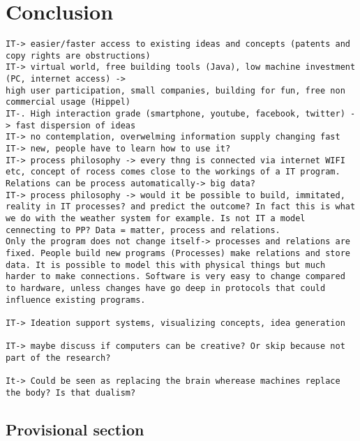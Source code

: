 \chapter{Conclusion}

\begin{verbatim}
IT-> easier/faster access to existing ideas and concepts (patents and copy rights are obstructions)
IT-> virtual world, free building tools (Java), low machine investment (PC, internet access) -> 
high user participation, small companies, building for fun, free non commercial usage (Hippel)
IT-. High interaction grade (smartphone, youtube, facebook, twitter) -> fast dispersion of ideas
IT-> no contemplation, overwelming information supply changing fast
IT-> new, people have to learn how to use it?
IT-> process philosophy -> every thng is connected via internet WIFI etc, concept of rocess comes close to the workings of a IT program. Relations can be process automatically-> big data?
IT-> process philosophy -> would it be possible to build, immitated, reality in IT processes? and predict the outcome? In fact this is what we do with the weather system for example. Is not IT a model cennecting to PP? Data = matter, process and relations.
Only the program does not change itself-> processes and relations are fixed. People build new programs (Processes) make relations and store data. It is possible to model this with physical things but much harder to make connections. Software is very easy to change compared to hardware, unless changes have go deep in protocols that could influence existing programs.

IT-> Ideation support systems, visualizing concepts, idea generation

IT-> maybe discuss if computers can be creative? Or skip because not part of the research?

It-> Could be seen as replacing the brain wherease machines replace the body? Is that dualism?
\end{verbatim}

\section{Provisional section}